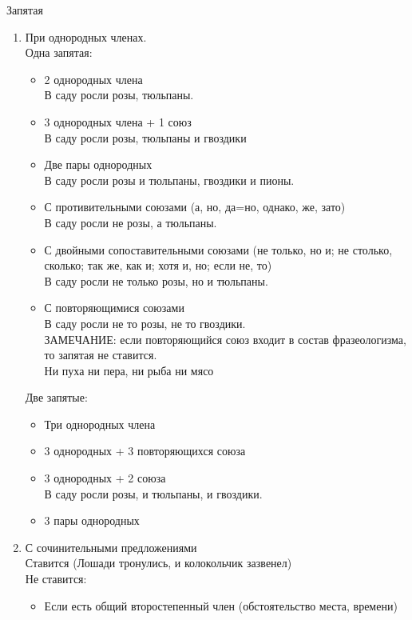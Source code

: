 \documentclass{article}
\begin{document}
Запятая

\begin{enumerate}
\item
  При однородных членах.\\
  Одна запятая:
  \begin{itemize}
  \item
    2 однородных члена\\
    В саду росли розы, тюльпаны.
  \item
    3 однородных члена + 1 союз\\
    В саду росли розы, тюльпаны и гвоздики
  \item
    Две пары однородных\\
    В саду росли розы и тюльпаны, гвоздики и пионы.
  \item
    С противительными союзами (а, но, да=но, однако, же, зато)\\
    В саду росли не розы, а тюльпаны.
  \item
    С двойными сопоставительными союзами (не только, но и; не столько, сколько; так же, как и; хотя и, но; если не, то)\\
    В саду росли не только розы, но и тюльпаны.
  \item
    С повторяющимися союзами\\
    В саду росли не то розы, не то гвоздики.\\
    ЗАМЕЧАНИЕ: если повторяющийся союз входит в состав фразеологизма, то запятая не ставится.\\
    Ни пуха ни пера, ни рыба ни мясо
  \end{itemize}
  Две запятые:
  \begin{itemize}
  \item
    Три однородных члена
  \item
    3 однородных + 3 повторяющихся союза
  \item
    3 однородных + 2 союза\\
    В саду росли розы, и тюльпаны, и гвоздики.
  \item
    3 пары однородных
  \end{itemize}
\item
  С сочинительными предложениями\\
  Ставится (Лошади тронулись, и колокольчик зазвенел)\\
  Не ставится:
  \begin{itemize}
  \item
    Если есть общий второстепенный член (обстоятельство места, времени)\\

\end{itemize}
\end{enumerate}
\end{document}
